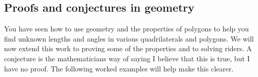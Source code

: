 %         
% 
          
%     
%     
%     
    
    
    
  
\label{m39352*secfhsst!!!underscore!!!id933}
            \subsection{ Proofs and conjectures in geometry}
            \nopagebreak
            \label{m39352*id0723}You have seen how to use geometry and the properties of polygons to help you find unknown lengths and angles in various quadrilaterals and polygons. We will now extend this work to proving some of the properties and to solving riders. A conjecture is the mathematicians way of saying I believe that this is true, but I have no proof. The following worked examples will help make this clearer. 
\par 
\label{m39352*probfhsst!!!underscore!!!id072}\vspace{.5cm} 
      
